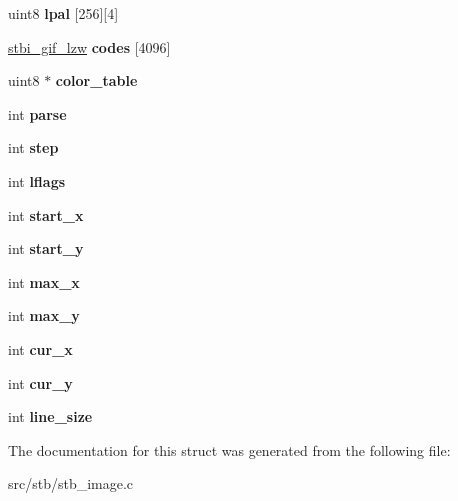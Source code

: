 \begin{DoxyCompactItemize}
\mbox{\label{structstbi__gif__struct_af2bf4a7890065ce54b8b59c6fd008e5f}} 
uint8 {\bfseries lpal} \mbox{[}256\mbox{]}\mbox{[}4\mbox{]}
\item 
\mbox{\label{structstbi__gif__struct_a4644d2fe2c84e410ab235ea415e9a740}} 
\hyperlink{structstbi__gif__lzw__struct}{stbi\+\_\+gif\+\_\+lzw} {\bfseries codes} \mbox{[}4096\mbox{]}
\item 
\mbox{\label{structstbi__gif__struct_aa10fee29a36ac4b9cae98300f839d091}} 
uint8 $\ast$ {\bfseries color\+\_\+table}
\item 
\mbox{\label{structstbi__gif__struct_a7a57ec19955875d52af26851ef332db8}} 
int {\bfseries parse}
\item 
\mbox{\label{structstbi__gif__struct_a61556e0a3ff8f19fa80401de5da1f079}} 
int {\bfseries step}
\item 
\mbox{\label{structstbi__gif__struct_a01e6981357bbd283177f70f87050a49d}} 
int {\bfseries lflags}
\item 
\mbox{\label{structstbi__gif__struct_ad3899ad3323686e963a7322e9a80bb05}} 
int {\bfseries start\+\_\+x}
\item 
\mbox{\label{structstbi__gif__struct_a7f4974b80d6e6f4f56b5fd02a9c1c121}} 
int {\bfseries start\+\_\+y}
\item 
\mbox{\label{structstbi__gif__struct_a02391438194b161d16bdf95878be6a66}} 
int {\bfseries max\+\_\+x}
\item 
\mbox{\label{structstbi__gif__struct_aff3410e0fff097d4719e54096f6da69b}} 
int {\bfseries max\+\_\+y}
\item 
\mbox{\label{structstbi__gif__struct_adbc7ae7e9ff2e2abdf66eb0e1a4b3ffb}} 
int {\bfseries cur\+\_\+x}
\item 
\mbox{\label{structstbi__gif__struct_ac61865216c4b578c235f5b8170c2036c}} 
int {\bfseries cur\+\_\+y}
\item 
\mbox{\label{structstbi__gif__struct_a5b7d7625c253025ff5ee4169afbf06b7}} 
int {\bfseries line\+\_\+size}
\end{DoxyCompactItemize}


The documentation for this struct was generated from the following file\+:\begin{DoxyCompactItemize}
\item 
src/stb/stb\+\_\+image.\+c\end{DoxyCompactItemize}
